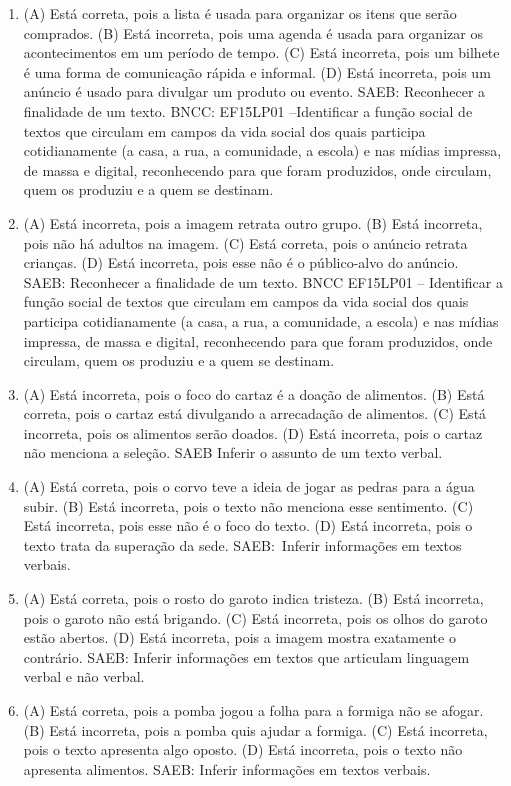 \begin{enumerate}
\item
(A) Está correta, pois a lista é usada para organizar os itens que serão comprados.
(B) Está incorreta, pois uma agenda é usada para organizar os acontecimentos em um período de tempo.
(C) Está incorreta, pois um bilhete é uma forma de comunicação rápida e informal.
(D) Está incorreta, pois um anúncio é usado para divulgar um produto ou evento.
SAEB: Reconhecer a finalidade de um texto.
BNCC: EF15LP01 --Identificar a função social de textos que
circulam em campos da vida social dos quais participa cotidianamente (a
casa, a rua, a comunidade, a escola) e nas mídias impressa, de massa e
digital, reconhecendo para que foram produzidos, onde circulam, quem os
produziu e a quem se destinam.

\item
(A) Está incorreta, pois a imagem retrata outro grupo.
(B) Está incorreta, pois não há adultos na imagem.
(C) Está correta, pois o anúncio retrata crianças.
(D) Está incorreta, pois esse não é o público-alvo do anúncio.
SAEB: Reconhecer a finalidade de um texto.
BNCC EF15LP01 -- Identificar a função social de textos que circulam em
campos da vida social dos quais participa cotidianamente (a casa, a rua,
a comunidade, a escola) e nas mídias impressa, de massa e digital,
reconhecendo para que foram produzidos, onde circulam, quem os produziu
e a quem se destinam.

\item
(A) Está incorreta, pois o foco do cartaz é a doação de alimentos.
(B) Está correta, pois o cartaz está divulgando a arrecadação de alimentos.
(C) Está incorreta, pois os alimentos serão doados.
(D) Está incorreta, pois o cartaz não menciona a seleção.
SAEB Inferir o assunto de um texto verbal.

\item
(A) Está correta, pois o corvo teve a ideia de jogar as pedras para a água subir.
(B) Está incorreta, pois o texto não menciona esse sentimento.
(C) Está incorreta, pois esse não é o foco do texto.
(D) Está incorreta, pois o texto trata da superação da sede.
SAEB:~Inferir informações em textos verbais.

\item
(A) Está correta, pois o rosto do garoto indica tristeza.
(B) Está incorreta, pois o garoto não está brigando.
(C) Está incorreta, pois os olhos do garoto estão abertos.
(D) Está incorreta, pois a imagem mostra exatamente o contrário.
SAEB: Inferir informações em textos que articulam linguagem verbal e não verbal.

\item
(A) Está correta, pois a pomba jogou a folha para a formiga não se afogar.
(B) Está incorreta, pois a pomba quis ajudar a formiga.
(C) Está incorreta, pois o texto apresenta algo oposto.
(D) Está incorreta, pois o texto não apresenta alimentos.
SAEB: Inferir informações em textos verbais.

\end{enumerate}

